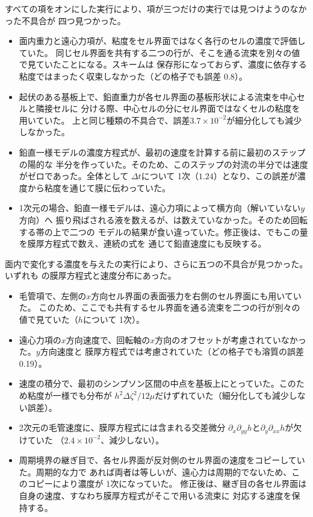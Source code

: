 すべての項をオンにした実行により、項が三つだけの実行では見つけようのなかった不具合が
四つ見つかった。
\begin{itemize}
  \item 面内重力と遠心力項が、粘度をセル界面ではなく各行のセルの濃度で評価していた。
    同じセル界面を共有する二つの行が、そこを通る流束を別々の値で見ていたことになる。スキームは
    保存形になっておらず、濃度に依存する粘度ではまったく収束しなかった（どの格子でも誤差 0.8）。
  \item 起伏のある基板上で、鉛直重力が各セル界面の基板形状による流束を中心セルと隣接セルに
    分ける際、中心セルの分にセル界面ではなくセルの粘度を用いていた。
    上と同じ種類の不具合で、誤差$3.7\times10^{-2}$が細分化しても減少しなかった。
  \item 鉛直一様モデルの濃度方程式が、最初の速度を計算する前に最初のステップの陽的な
    半分を作っていた。そのため、このステップの対流の半分では速度がゼロであった。全体として
    $\Delta t$について 1次（$1.24$）となり、この誤差が濃度から粘度を通じて膜に伝わっていた。
  \item 1次元の場合、鉛直一様モデルは、遠心力項によって横方向（解いていない$y$方向）へ
    振り飛ばされる液を数えるが、は数えていなかった。そのため回転する帯の上で二つの
    モデルの結果が食い違っていた。修正後は、でもこの量を膜厚方程式で数え、連続の式を
    通じて鉛直速度にも反映する。
\end{itemize}

面内で変化する濃度を与えたの実行により、さらに五つの不具合が見つかった。いずれも
の膜厚方程式と速度分布にあった。
\begin{itemize}
  \item 毛管項で、左側の$x$方向セル界面の表面張力を右側のセル界面にも用いていた。
    このため、ここでも共有するセル界面を通る流束を二つの行が別々の値で見ていた（$h$について 1次）。
  \item 遠心力項の$x$方向速度で、回転軸の$x$方向のオフセットが考慮されていなかった。$y$方向速度と
    膜厚方程式では考慮されていた（どの格子でも溶質の誤差 0.19）。
  \item 速度の積分で、最初のシンプソン区間の中点を基板上にとっていた。このため粘度が一様でも分布が
    $h^2\Delta\zeta^2/12\mu$だけずれていた（細分化しても減少しない誤差）。
  \item 2次元の毛管速度に、膜厚方程式には含まれる交差微分
    $\partial_x\partial_{yy}h$と$\partial_y\partial_{xx}h$が欠けていた
    （$2.4\times10^{-2}$、減少しない）。
  \item 周期境界の継ぎ目で、各セル界面が反対側のセル界面の速度をコピーしていた。周期的な力で
    あれば両者は等しいが、遠心力は周期的でないため、このコピーにより濃度が 1次になっていた。
    修正後は、継ぎ目の各セル界面は自身の速度、すなわち膜厚方程式がそこで用いる流束に
    対応する速度を保持する。
\end{itemize}


